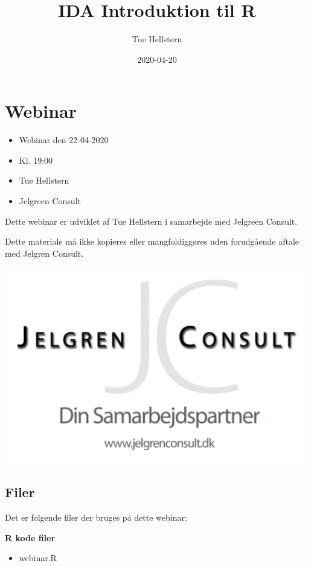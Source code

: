 \documentclass[
]{book}
\title{IDA Introduktion til R}
\author{Tue Hellstern}
\date{2020-04-20}
\providecommand{\tightlist}{%
  \setlength{\itemsep}{0pt}\setlength{\parskip}{0pt}}
\begin{document}
\maketitle

{
\setcounter{tocdepth}{1}
\tableofcontents
}
\hypertarget{webinar}{%
\chapter{Webinar}\label{webinar}}

\begin{itemize}
\tightlist
\item
  Webinar den 22-04-2020
\item
  Kl. 19:00
\item
  Tue Hellstern
\item
  Jelgreen Consult
\end{itemize}

Dette webinar er udviklet af Tue Hellstern i samarbejde med Jelgreen Consult.

Dette materiale må ikke kopieres eller mangfoldiggøres uden forudgående aftale med Jelgren Consult.

\includegraphics{img/jelgreen.png}

\hypertarget{filer}{%
\section{Filer}\label{filer}}

Det er følgende filer der bruges på dette webinar:

\textbf{R kode filer}

\begin{itemize}
\tightlist
\item
  webinar.R
\end{itemize}
\end{document}

